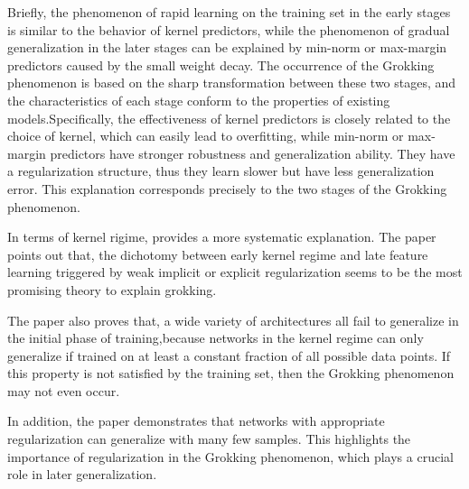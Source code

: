 \documentclass[UTF8]{article}
\begin{document}
Briefly, the phenomenon of rapid learning on the training set in the early stages is 
similar to the behavior of kernel predictors, while the phenomenon of gradual 
generalization in the later stages can be explained by min-norm or max-margin predictors 
caused by the small weight decay. The occurrence of the Grokking phenomenon is based 
on the sharp transformation between these two stages, and the characteristics of 
each stage conform to the properties of existing models.Specifically, 
the effectiveness of kernel predictors is closely related to the choice of kernel, 
which can easily lead to overfitting, while min-norm or max-margin predictors have 
stronger robustness and generalization ability. They have a regularization structure, 
thus they learn slower but have less generalization error.
This explanation corresponds precisely to the two stages of the Grokking phenomenon.


In terms of kernel rigime, \cite{mohamadi2024you} provides a more systematic explanation. 
The paper points out that, the dichotomy between early kernel regime and late feature 
learning triggered by weak implicit or explicit regularization seems to be 
the most promising theory to explain grokking. 


The paper also proves that, a wide variety of architectures all fail to generalize 
in the initial phase of training,because networks in the kernel regime can only generalize 
if trained on at least a constant fraction of all possible data points. If this property 
is not satisfied by the training set, then the Grokking phenomenon may not even occur.


In addition, the paper demonstrates that networks with appropriate regularization 
can generalize with many few samples. 
This highlights the importance of regularization in the Grokking phenomenon, 
which plays a crucial role in later generalization.

\appendix



\end{document}
